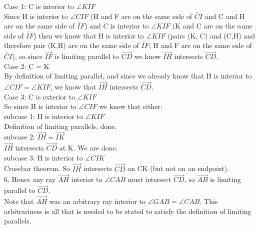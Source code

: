 \documentclass[12pt,letterpaper]{article}
\begin{document}
Case 1: C is interior to $\angle KIF$\\

Since H is interior to $\angle CIF$ (H and F are on the same side of $\overleftrightarrow{CI}$ and C and H are on the same side of $\overleftrightarrow{IF}$) and $C$ is interior to $\angle KIF$ (K and C are on the same side of $\overleftrightarrow{IF}$) then we know that H is interior to  $\angle KIF$ (pairs (K, C) and (C,H) and therefore pair (K,H) are on the same side of $\overleftrightarrow{IF}$; H and F are on the same side of $\overleftrightarrow{CI}$), so since $\overrightarrow{IF}$ is limiting parallel to $\overrightarrow{CD}$ we know $\overrightarrow{IH}$ intersects $\overrightarrow{CD}$.\\


Case 2: C = K\\

By definition of limiting parallel, and since we already know that H is interior to $\angle CIF = \angle KIF$, we know that $\overrightarrow{IH}$ intersects $\overrightarrow{CD}$. \\ 


Case 3: C is exterior to $\angle KIF$\\

So since H is interior to $\angle CIF$ we know that either:\\

subcase 1: H is interior to $\angle KIF$\\

Definition of limiting parallels, done. \\

subcase 2: $\overrightarrow{IH} = \overrightarrow{IK}$\\

$\overrightarrow{IH}$ intersects $\overrightarrow{CD}$ at K.  We are done.\\ 

subcase 3: H is interior to $\angle CIK$\\

Crossbar theorem. So $\overrightarrow{IH}$ intersects $\overrightarrow{CD}$ on CK (but not on an endpoint).\\


6. Hence any ray $\overrightarrow{AH}$ interior to $\angle CAB$ must intersect $\overrightarrow{CD}$, so $\overrightarrow{AB}$ is limiting parallel to $\overrightarrow{CD}$. \\

Note that $\overrightarrow{AH}$ was an arbitrary ray interior to $\angle GAB = \angle CAB$.  This arbitrariness is all that is needed to be stated to satisfy the definition of limiting parallels.\\
\end{document}
